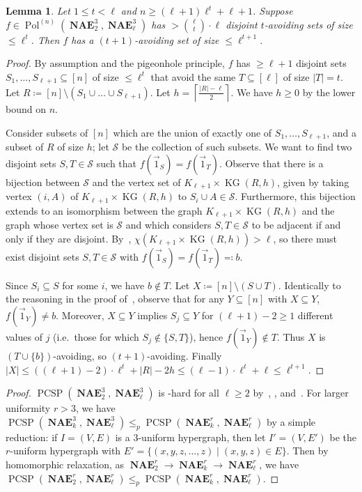 \documentclass[a4paper,11pt]{article}
\newcommand{\2}{\vec{2}}
\newcommand{\1}{\vec{1}}
\newcommand{\0}{\vec{0}}
\newcommand{\KK}{\ensuremath{K}}
\DeclareMathOperator{\KG}{KG}
\DeclareMathOperator{\PCSP}{PCSP}
\DeclareMathOperator{\Pol}{Pol}
\DeclareMathOperator{\NAE}{\mathbf{NAE}}
\theoremstyle{plain}
\newtheorem{lemma}[theorem]{Lemma}
\theoremstyle{definition}
\begin{document}
\begin{lemma}\label{lem:lem2}
	Let $1\leq t < \ell$ and $n \geq (\ell+1) \ell^t + \ell+1$.
  Suppose $f \in \Pol^{(n)}(\NAE_2^3, \NAE_\ell^3)$ has $>\binom{\ell}{t}\cdot \ell$ disjoint $t$-avoiding sets of size $\leq \ell^t$.
	Then $f$ has a $(t+1)$-avoiding set of size $\leq \ell^{t+1}$.	
\end{lemma}
\begin{proof}
	By assumption and the pigeonhole principle, $f$ has $\geq \ell+1$ disjoint sets $S_1,\dots,S_{\ell+1}\subseteq [n]$ of size $\leq \ell^t$ that avoid the same $T \subseteq [\ell]$ of size $|T|=t$.
	Let $R \coloneq [n] \setminus (S_1 \cup \dots \cup S_{\ell+1})$.
	Let $h = \left\lceil \frac{|R|-\ell}{2}\right\rceil$. We have $h \geq 0$ by the lower bound on $n$.
    
	Consider subsets of $[n]$ which are the union of exactly one of $S_1,\dots,S_{\ell+1}$, and a subset of $R$ of size $h$; let $\mathcal{S}$ be the collection of such subsets. We want to find two disjoint sets $S, T \in \mathcal{S}$ such that $f(\1_S) = f(\1_T)$.
    Observe that there is a bijection between $\mathcal{S}$ and the vertex set of $\KK_{
    \ell + 1} \times \KG(R, h)$, given by taking vertex $(i, A)$ of $\KK_{
    \ell + 1} \times \KG(R, h)$ to $S_i \cup A \in \mathcal{S}$. Furthermore, this bijection extends to an isomorphism between the graph  $\KK_{
    \ell + 1} \times \KG(R, h)$ and the graph whose vertex set is $\mathcal{S}$ and which considers $S, T \in \mathcal{S}$ to be adjacent if and only if they are disjoint.
	By~, $\chi(\KK_{\ell+1} \times \KG(R,h)) > \ell$, so there must exist disjoint sets $S, T \in \mathcal{S}$ with $f(\1_S) = f(\1_T) \eqqcolon b$.
    
	Since $S_i \subseteq S$ for some $i$, we have $b \not\in T$.
	Let $X \coloneqq [n] \setminus (S \cup T)$. Identically to the reasoning in
  the proof of~, observe that for any
	$Y \subseteq [n]$ with $X\subseteq Y$, $f(\1_{Y}) \neq b$.
	Moreover, $X\subseteq Y$ implies  $S_j \subseteq Y$ for
  $(\ell+1)-2 \geq 1$ different values of $j$ (i.e.~those for which $S_j \not \in \{S, T\}$), hence $f(\1_{Y}) \not \in T$.
	Thus $X$ is $(T \cup \{b\})$-avoiding, so $(t + 1)$-avoiding.
	Finally $|X| \leq ((\ell+1)-2) \cdot \ell^t + |R|-2h \leq (\ell-1) \cdot \ell^t + \ell \leq \ell^{t+1}$.
\end{proof}

\main*

\begin{proof}
$\PCSP(\NAE_2^3,\NAE_\ell^3)$ is \NP-hard for all $\ell \geq 2$ by~, , and~. For larger uniformity $r>3$, we have $\PCSP(\NAE_k^{3},\NAE_\ell^{3}) \leq_p \PCSP(\NAE_k^{r}, \NAE_\ell^{r})$ by a simple reduction: if $I = (V,E)$ is a 3-uniform hypergraph, then let $I'=(V,E')$ be the $r$-uniform hypergraph with $E' = \{(x,y,z,\ldots,z)\mid (x,y,z) \in E\}$. Then by homomorphic relaxation, as $\NAE_2^r\to\NAE_k^r\to\NAE_\ell^r$, we have $\PCSP(\NAE_2^r,\NAE_\ell^r)\leq_p \PCSP(\NAE_k^r,\NAE_\ell^r)$.
\end{proof}
\end{document}
